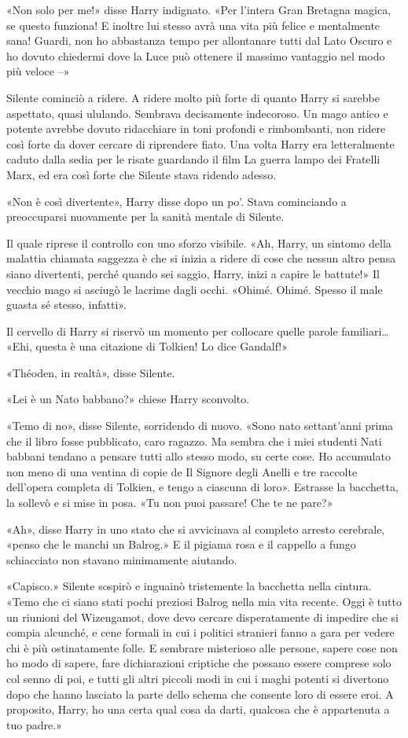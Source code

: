 «Non solo per me!» disse Harry indignato. «Per l’intera Gran Bretagna magica, se questo funziona! E inoltre lui stesso avrà una vita più felice e mentalmente sana! Guardi, non ho abbastanza tempo per allontanare tutti dal Lato Oscuro e ho dovuto chiedermi dove la Luce può ottenere il massimo vantaggio nel modo più veloce –»

Silente cominciò a ridere. A ridere molto più forte di quanto Harry si sarebbe aspettato, quasi ululando. Sembrava decisamente indecoroso. Un mago antico e potente avrebbe dovuto ridacchiare in toni profondi e rimbombanti, non ridere così forte da dover cercare di riprendere fiato. Una volta Harry era letteralmente caduto dalla sedia per le risate guardando il film La guerra lampo dei Fratelli Marx, ed era così forte che Silente stava ridendo adesso.

«Non è così divertente», Harry disse dopo un po’. Stava cominciando a preoccuparsi nuovamente per la sanità mentale di Silente.

Il quale riprese il controllo con uno sforzo visibile. «Ah, Harry, un sintomo della malattia chiamata saggezza è che si inizia a ridere di cose che nessun altro pensa siano divertenti, perché quando sei saggio, Harry, inizi a capire le battute!» Il vecchio mago si asciugò le lacrime dagli occhi. «Ohimé. Ohimé. Spesso il male guasta sé stesso, infatti».

Il cervello di Harry si riservò un momento per collocare quelle parole familiari… «Ehi, questa è una citazione di Tolkien! Lo dice Gandalf!»

«Théoden, in realtà», disse Silente.

«Lei è un Nato babbano?» chiese Harry sconvolto.

«Temo di no», disse Silente, sorridendo di nuovo. «Sono nato settant’anni prima che il libro fosse pubblicato, caro ragazzo. Ma sembra che i miei studenti Nati babbani tendano a pensare tutti allo stesso modo, su certe cose. Ho accumulato non meno di una ventina di copie de Il Signore degli Anelli e tre raccolte dell’opera completa di Tolkien, e tengo a ciascuna di loro». Estrasse la bacchetta, la sollevò e si mise in posa. «Tu non puoi passare! Che te ne pare?»

«Ah», disse Harry in uno stato che si avvicinava al completo arresto cerebrale, «penso che le manchi un Balrog.» E il pigiama rosa e il cappello a fungo schiacciato non stavano minimamente aiutando.

«Capisco.» Silente sospirò e inguainò tristemente la bacchetta nella cintura. «Temo che ci siano stati pochi preziosi Balrog nella mia vita recente. Oggi è tutto un riunioni del Wizengamot, dove devo cercare disperatamente di impedire che si compia alcunché, e cene formali in cui i politici stranieri fanno a gara per vedere chi è più ostinatamente folle. E sembrare misterioso alle persone, sapere cose non ho modo di sapere, fare dichiarazioni criptiche che possano essere comprese solo col senno di poi, e tutti gli altri piccoli modi in cui i maghi potenti si divertono dopo che hanno lasciato la parte dello schema che consente loro di essere eroi. A proposito, Harry, ho una certa qual cosa da darti, qualcosa che è appartenuta a tuo padre.»

